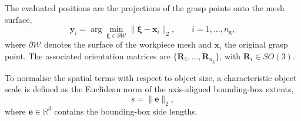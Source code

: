 \begin{enumerate}
The evaluated positions are the projections of the grasp points onto the mesh surface,
\begin{equation}
    \mathbf{y}_i = \arg\min_{\boldsymbol{\xi} \in \partial \mathcal{W}}
    \|\boldsymbol{\xi} - \mathbf{x}_i\|_2 ,
    \qquad i = 1,\dots,n_{\mathrm{g}},
\end{equation}
where $\partial \mathcal{W}$ denotes the surface of the workpiece mesh and $\mathbf{x}_i$ the
original grasp point. The associated orientation matrices are
$\{\mathbf{R}_1,\dots,\mathbf{R}_{n_{\mathrm{g}}}\}$, with $\mathbf{R}_i \in SO(3)$.

To normalise the spatial terms with respect to object size, a characteristic object scale is defined
as the Euclidean norm of the axis-aligned bounding-box extents,
\begin{equation}
    s = \|\mathbf{e}\|_2 ,
\end{equation}
where $\mathbf{e} \in \mathbb{R}^3$ contains the bounding-box side lengths.


\end{enumerate}
